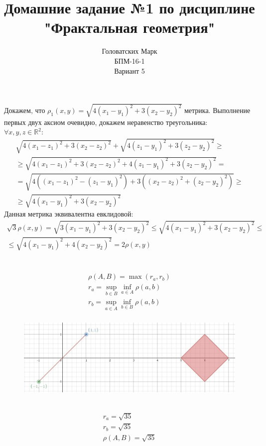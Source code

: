 \documentclass [a4paper,12pt]{article}
\title{Домашние задание №1 по дисциплине "Фрактальная геометрия"}
\author{Головатских Марк \\БПМ-16-1 \\ Вариант 5}
\date{}
\begin{document}
\maketitle
{}
\newpage
{}
\section{} %
Докажем, что $\rho_1(x,y)=\sqrt{4(x_1-y_1)^2 + 3(x_2 - y_2)^2}$ метрика. Выполнение первых двух аксиом очевидно, докажем неравенство треугольника:\\
$\forall x,y,z \in \mathbb{R}^2$:
\begin{multline*}
  \sqrt{4(x_1-z_1)^2 + 3(x_2 - z_2)^2} + \sqrt{4(z_1-y_1)^2 + 3(z_2 - y_2)^2} \geq \\
  \geq \sqrt{4(x_1-z_1)^2 + 3(x_2 - z_2)^2 + 4(z_1-y_1)^2 + 3(z_2 - y_2)^2} = \\
  = \sqrt{4((x_1-z_1)^2 - (z_1-y_1)^2) + 3((x_2 - z_2)^2 + (z_2 - y_2)^2)} \geq \\
  \geq \sqrt{4(x_1-y_1)^2 + 3(x_2 - y_2)^2}
\end{multline*}
Данная метрика эквивалентна евклидовой:
\begin{multline*}
\sqrt{3}\rho(x,y) = \sqrt{3(x_1-y_1)^2 + 3(x_2 - y_2)^2} \leq \sqrt{4(x_1-y_1)^2 + 3(x_2 - y_2)^2} \leq \\
 \leq \sqrt{4(x_1-y_1)^2 + 4(x_2 - y_2)^2} = 2\rho(x,y)
\end{multline*}
\section{} %
\begin{equation*}
  \begin{aligned}
    \rho(A, B) = \max(r_a, r_b)\\
    r_a = \sup_{b \in B}\inf_{a \in A}\rho(a, b)\\
    r_b = \sup_{a \in A}\inf_{b \in B}\rho(a, b)\\
  \end{aligned}
\end{equation*}
\begin{figure}[h!]
  \includegraphics[width=\linewidth]{hw1-1.jpg}
\end{figure}\\
\begin{equation*}
\begin{aligned}
r_a = \sqrt{35}\\
r_b = \sqrt{35}\\
\rho(A, B) = \sqrt{35}\\
\end{aligned}
\end{equation*}
\end{document}
